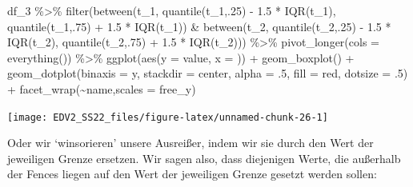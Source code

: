 \documentclass[
]{book}
\newenvironment{Shaded}{\begin{snugshade}}{\end{snugshade}}
\newcommand{\AttributeTok}[1]{\textcolor[rgb]{0.77,0.63,0.00}{#1}}
\newcommand{\DecValTok}[1]{\textcolor[rgb]{0.00,0.00,0.81}{#1}}
\newcommand{\FloatTok}[1]{\textcolor[rgb]{0.00,0.00,0.81}{#1}}
\newcommand{\FunctionTok}[1]{\textcolor[rgb]{0.00,0.00,0.00}{#1}}
\newcommand{\NormalTok}[1]{#1}
\newcommand{\SpecialCharTok}[1]{\textcolor[rgb]{0.00,0.00,0.00}{#1}}
\newcommand{\StringTok}[1]{\textcolor[rgb]{0.31,0.60,0.02}{#1}}
\begin{document}
\begin{Shaded}
\begin{Highlighting}[]
\NormalTok{df\_3 }\SpecialCharTok{\%\textgreater{}\%} 
  \FunctionTok{filter}\NormalTok{(}\FunctionTok{between}\NormalTok{(t\_1, }
                 \FunctionTok{quantile}\NormalTok{(t\_1,.}\DecValTok{25}\NormalTok{) }\SpecialCharTok{{-}} \FloatTok{1.5} \SpecialCharTok{*} \FunctionTok{IQR}\NormalTok{(t\_1),}
                 \FunctionTok{quantile}\NormalTok{(t\_1,.}\DecValTok{75}\NormalTok{) }\SpecialCharTok{+} \FloatTok{1.5} \SpecialCharTok{*} \FunctionTok{IQR}\NormalTok{(t\_1)) }\SpecialCharTok{\&}
           \FunctionTok{between}\NormalTok{(t\_2, }
                 \FunctionTok{quantile}\NormalTok{(t\_2,.}\DecValTok{25}\NormalTok{) }\SpecialCharTok{{-}} \FloatTok{1.5} \SpecialCharTok{*} \FunctionTok{IQR}\NormalTok{(t\_2),}
                 \FunctionTok{quantile}\NormalTok{(t\_2,.}\DecValTok{75}\NormalTok{) }\SpecialCharTok{+} \FloatTok{1.5} \SpecialCharTok{*} \FunctionTok{IQR}\NormalTok{(t\_2))) }\SpecialCharTok{\%\textgreater{}\%} 
  \FunctionTok{pivot\_longer}\NormalTok{(}\AttributeTok{cols =} \FunctionTok{everything}\NormalTok{()) }\SpecialCharTok{\%\textgreater{}\%} 
  \FunctionTok{ggplot}\NormalTok{(}\FunctionTok{aes}\NormalTok{(}\AttributeTok{y =}\NormalTok{ value, }\AttributeTok{x =} \StringTok{\textquotesingle{}\textquotesingle{}}\NormalTok{)) }\SpecialCharTok{+}
  \FunctionTok{geom\_boxplot}\NormalTok{() }\SpecialCharTok{+}
  \FunctionTok{geom\_dotplot}\NormalTok{(}\AttributeTok{binaxis =} \StringTok{\textquotesingle{}y\textquotesingle{}}\NormalTok{,}
               \AttributeTok{stackdir =} \StringTok{\textquotesingle{}center\textquotesingle{}}\NormalTok{,}
               \AttributeTok{alpha =}\NormalTok{ .}\DecValTok{5}\NormalTok{,}
               \AttributeTok{fill =} \StringTok{\textquotesingle{}red\textquotesingle{}}\NormalTok{,}
               \AttributeTok{dotsize =}\NormalTok{ .}\DecValTok{5}\NormalTok{) }\SpecialCharTok{+}
  \FunctionTok{facet\_wrap}\NormalTok{(}\SpecialCharTok{\textasciitilde{}}\NormalTok{name,}\AttributeTok{scales =} \StringTok{\textquotesingle{}free\_y\textquotesingle{}}\NormalTok{)}
\end{Highlighting}
\end{Shaded}

\begin{center}\texttt{[image: EDV2\_SS22\_files/figure-latex/unnamed-chunk-26-1]} \end{center}

Oder wir `winsorieren' unsere Ausreißer, indem wir sie durch den Wert der jeweiligen Grenze ersetzen.
Wir sagen also, dass diejenigen Werte, die außerhalb der Fences liegen auf den Wert der jeweiligen Grenze gesetzt werden sollen:
\end{document}
